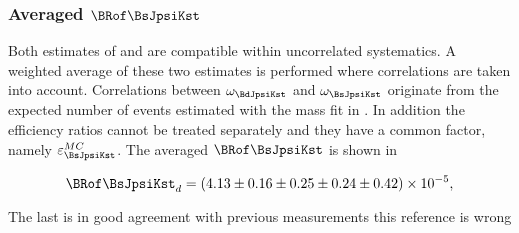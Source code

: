 \subsubsection{Averaged $\BRof\BsJpsiKst$}
Both estimates of  and  are compatible within uncorrelated systematics. A weighted average of these two
estimates is performed where correlations are taken into account. Correlations between $\omega_{\BdJpsiKst}$ and $\omega_{\BsJpsiKst}$ originate from the
expected number of events estimated with the mass fit in . In addition the efficiency ratios cannot be treated separately
and they have a common factor, namely $\varepsilon_{\BsJpsiKst}^{MC}$. The averaged  $\BRof\BsJpsiKst$ is shown in 

\begin{equation}
\BRof\BsJpsiKst_{d} = (4.13 \pm 0.16 \pm 0.25 \pm 0.24 \pm 0.42 )\times 10^{-5},
\label{Br_total}
\end{equation}

\noindent The last is in good agreement with previous measurements {\color{red} this reference is wrong}\cite{LHCb-PAPER-2015-006}
